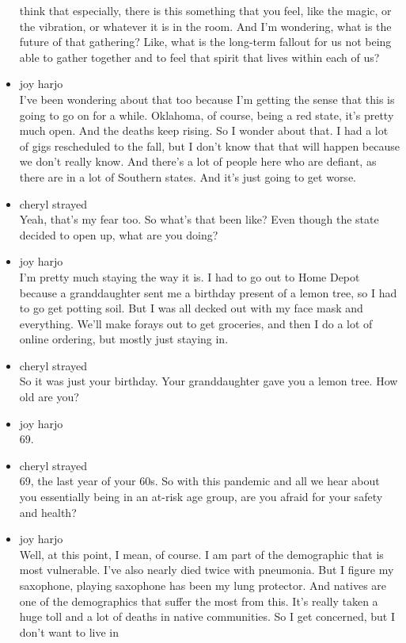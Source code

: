 \begin{itemize}
  think that especially, there is this something that you feel, like the
  magic, or the vibration, or whatever it is in the room. And I'm
  wondering, what is the future of that gathering? Like, what is the
  long-term fallout for us not being able to gather together and to feel
  that spirit that lives within each of us?
\item
  joy harjo\\
  I've been wondering about that too because I'm getting the sense that
  this is going to go on for a while. Oklahoma, of course, being a red
  state, it's pretty much open. And the deaths keep rising. So I wonder
  about that. I had a lot of gigs rescheduled to the fall, but I don't
  know that that will happen because we don't really know. And there's a
  lot of people here who are defiant, as there are in a lot of Southern
  states. And it's just going to get worse.
\item
  cheryl strayed\\
  Yeah, that's my fear too. So what's that been like? Even though the
  state decided to open up, what are you doing?
\item
  joy harjo\\
  I'm pretty much staying the way it is. I had to go out to Home Depot
  because a granddaughter sent me a birthday present of a lemon tree, so
  I had to go get potting soil. But I was all decked out with my face
  mask and everything. We'll make forays out to get groceries, and then
  I do a lot of online ordering, but mostly just staying in.
\item
  cheryl strayed\\
  So it was just your birthday. Your granddaughter gave you a lemon
  tree. How old are you?
\item
  joy harjo\\
  69.
\item
  cheryl strayed\\
  69, the last year of your 60s. So with this pandemic and all we hear
  about you essentially being in an at-risk age group, are you afraid
  for your safety and health?
\item
  joy harjo\\
  Well, at this point, I mean, of course. I am part of the demographic
  that is most vulnerable. I've also nearly died twice with pneumonia.
  But I figure my saxophone, playing saxophone has been my lung
  protector. And natives are one of the demographics that suffer the
  most from this. It's really taken a huge toll and a lot of deaths in
  native communities. So I get concerned, but I don't want to live in

\end{itemize}
